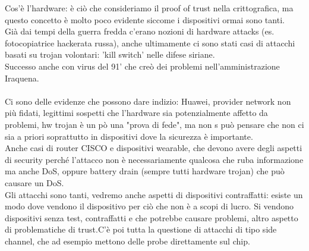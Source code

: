 \documentclass[oneside, 12pt]{extbook}
\begin{document}
Cos'è l'hardware: è ciò che consideriamo il proof of trust nella crittografica, ma questo concetto è molto poco evidente siccome i dispositivi ormai sono tanti.\\Già dai tempi della guerra fredda c'erano nozioni di hardware attacks (es. fotocopiatrice hackerata russa), anche ultimamente ci sono stati casi di attacchi basati su trojan volontari: 'kill switch' nelle difese siriane.\\Successo anche con virus del 91' che creò dei problemi nell'amministrazione Iraquena.\\\\Ci sono delle evidenze che possono dare indizio: Huawei, provider network non più fidati, legittimi sospetti che l'hardware sia potenzialmente affetto da problemi, hw trojan è un pò una "prova di fede", ma non s può pensare che non ci sia a priori soprattutto in dispositivi dove la sicurezza è importante.\\Anche casi di router CISCO e dispositivi wearable, che devono avere degli aspetti di security perché l'attacco non è necessariamente qualcosa che ruba informazione ma anche DoS, oppure battery drain (sempre tutti hardware trojan) che può causare un DoS.\\Gli attacchi sono tanti, vedremo anche aspetti di dispositivi contraffatti: esiste un modo dove vendono il dispositivo per ciò che non è a scopi di lucro. Si vendono dispositivi senza test, contraffatti e che potrebbe causare problemi, altro aspetto di problematiche di trust.C'è poi tutta la questione di attacchi di tipo side channel, che ad esempio mettono delle probe direttamente sul chip.
\end{document}
